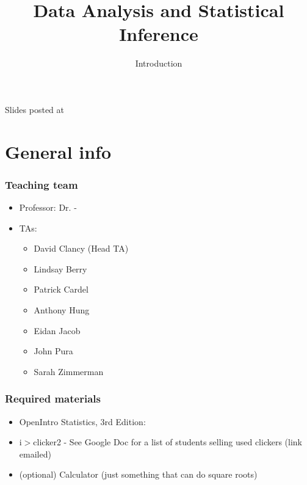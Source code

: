 \documentclass[slidestop,compress,mathserif,12pt,t,professionalfonts,xcolor=table]{beamer}
\title{Data Analysis and Statistical Inference}
\subtitle{Introduction}
\author{\CourseName}
\date{}
\institute{\InstituteName}
\begin{document}



\begin{frame}[plain]

\titlepage

\vfill

{\scriptsize {} \hfill Slides posted at  \webURL{\CourseSite}}

\addtocounter{framenumber}{-1} 

\end{frame}


\section{General info}


\begin{frame}
\frametitle{Teaching team}

\begin{itemize}

\item Professor: Dr. \FirstName{} \LastName{} - \mail{\Email{}}

\item TAs:
\begin{itemize}
\item David Clancy (Head TA)
\item Lindsay Berry
\item Patrick Cardel
\item Anthony Hung
\item Eidan Jacob
\item John Pura
\item Sarah Zimmerman
\end{itemize}

\end{itemize}

\end{frame}


\begin{frame}
\frametitle{Required materials}

\begin{itemize}

\item OpenIntro Statistics, 3rd Edition: 

\item i$>$clicker2 - See Google Doc for a list of students selling used clickers 
(link emailed)

\item (optional) Calculator (just something that can do square roots)

\end{itemize}

\end{frame}
\end{document}
